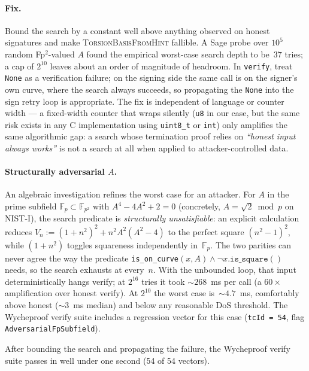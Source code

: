 \paragraph{Fix.}  Bound the search by a constant well above
anything observed on honest signatures and make
\textsc{TorsionBasisFromHint} fallible.  A Sage probe over
$10^5$ random Fp$^2$-valued $A$ found the empirical worst-case
search depth to be~$37$ tries; a cap of $2^{10}$ leaves
about an order of magnitude of headroom.  In \texttt{verify},
treat \texttt{None} as a verification failure; on the
signing side the same call is on the signer's own curve,
where the search always succeeds, so propagating the
\texttt{None} into the sign retry loop is appropriate.
The fix is independent of language or counter width --- a
fixed-width counter that wraps silently (\texttt{u8} in our
case, but the same risk exists in any C implementation using
\texttt{uint8\_t} or \texttt{int}) only amplifies the same
algorithmic gap: a search whose termination proof relies on
\textit{``honest input always works''} is not a search at all
when applied to attacker-controlled data.

\paragraph{Structurally adversarial $A$.}  An algebraic
investigation refines the worst case for an attacker.  For
$A$ in the prime subfield $\mathbb{F}_p \subset \mathbb{F}_{p^2}$
with $A^4 - 4A^2 + 2 = 0$ (concretely, $A = \sqrt{2} \bmod p$
on NIST-I), the search predicate is \emph{structurally
unsatisfiable}: an explicit calculation reduces
$V_n := (1+n^2)^2 + n^2 A^2 (A^2 - 4)$ to the perfect square
$(n^2 - 1)^2$, while $(1+n^2)$ toggles squareness
independently in~$\mathbb{F}_p$.  The two parities can never
agree the way the predicate
\texttt{is\_on\_curve}$(x, A) \land \lnot x\texttt{.is\_square}()$
needs, so the search exhausts at every~$n$.  With the
unbounded loop, that input deterministically hangs verify; at
$2^{16}$ tries it took $\sim 268$~ms per call (a
$60\times$ amplification over honest verify).  At $2^{10}$
the worst case is~$\sim 4.7$~ms, comfortably above honest
($\sim 3$~ms median) and below any reasonable DoS threshold.
The Wycheproof verify suite includes a regression vector for
this case (\texttt{tcId = 54}, flag
\texttt{AdversarialFpSubfield}).

After bounding the search and propagating the failure, the
Wycheproof verify suite passes in well under one second (54
of 54 vectors).

